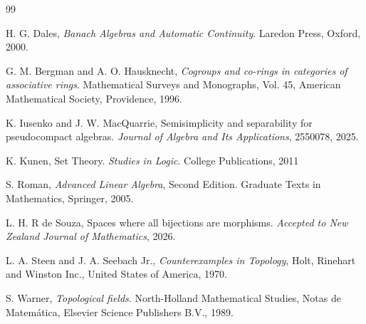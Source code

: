 \documentclass[a4paper,12pt]{article}
\theoremstyle{bloco}
\begin{document}
\begin{thebibliography}{99}

H. G. Dales,
\textit{Banach Algebras and Automatic Continuity}.
Laredon Press, Oxford, 2000.


G. M. Bergman and A. O. Hausknecht, \textit{Cogroups and co-rings in categories of associative rings}. 
Mathematical Surveys and Monographs, Vol. 45, American Mathematical Society, Providence, 1996.

K. Iusenko and J. W. MacQuarrie, Semisimplicity and separability for pseudocompact algebras.
\textit{Journal of Algebra and Its Applications},  2550078, 2025.

K. Kunen, Set Theory.
\textit{Studies in Logic}. College Publications, 2011

S. Roman, \textit{Advanced Linear Algebra}, Second Edition.
Graduate Texts in Mathematics, Springer, 2005.

L. H. R de Souza, Spaces where all bijections are morphisms.
\textit{Accepted to New Zealand Journal of Mathematics}, 2026.

L. A. Steen and J. A. Seebach Jr., {\it Counterexamples in Topology},
Holt, Rinehart and Winston Inc., United States of America, 1970.

S. Warner,
\textit{Topological fields}. North-Holland Mathematical Studies, Notas de Matemática, Elsevier Science Publishers B.V., 1989.



\end{thebibliography}
\end{document}
